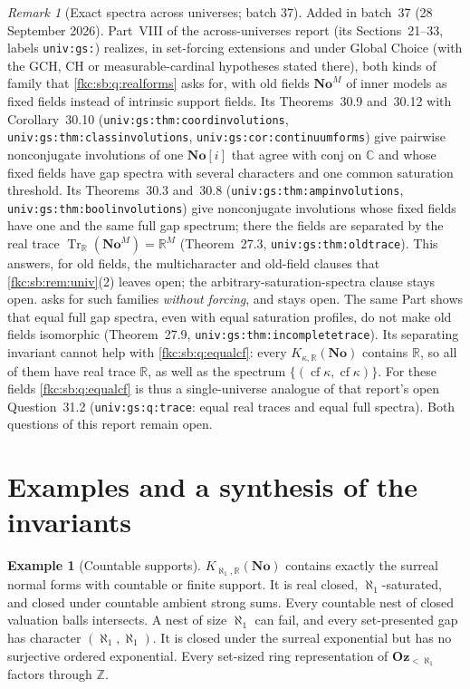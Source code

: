 \documentclass[11pt,letterpaper]{article}
\numberwithin{equation}{section}
\theoremstyle{definition}
\newtheorem{example}[theorem]{Example}
\theoremstyle{remark}
\newtheorem{remark}[theorem]{Remark}
\newcommand{\R}{\mathbb R}
\newcommand{\C}{\mathbb C}
\newcommand{\No}{\mathbf{No}}
\newcommand{\cf}{\operatorname{cf}}
\newcommand{\Z}{\mathbb Z}
\newcommand{\Oz}{\mathbf{Oz}}
\newcommand{\SC}{\mathbf{No}[i]}
\newcommand{\conj}{\mathrm{conj}}
\newcommand{\KN}[2]{K_{#1,#2}(\No)}%
\newcommand{\Okl}[1]{\Oz_{<#1}}
\newcommand{\lbl}[1]{\nolinkurl{#1}}%
\begin{document}
\begin{remark}[Exact spectra across universes; batch 37]\label{fkc:sb:rem:gapspectra}
Added in batch~37 (28 September 2026). Part~VIII of the across-universes report \cite{CollUniv} (its Sections~21--33, labels \lbl{univ:gs:}) realizes, in set-forcing extensions and under Global Choice (with the GCH, CH or measurable-cardinal hypotheses stated there), both kinds of family that \cref{fkc:sb:q:realforms} asks for, with old fields $\No^M$ of inner models as fixed fields instead of intrinsic support fields. Its Theorems~30.9 and~30.12 with Corollary~30.10 (\lbl{univ:gs:thm:coordinvolutions}, \lbl{univ:gs:thm:classinvolutions}, \lbl{univ:gs:cor:continuumforms}) give pairwise nonconjugate involutions of one $\SC$ that agree with $\conj$ on $\C$ and whose fixed fields have gap spectra with several characters and one common saturation threshold. Its Theorems~30.3 and~30.8 (\lbl{univ:gs:thm:ampinvolutions}, \lbl{univ:gs:thm:boolinvolutions}) give nonconjugate involutions whose fixed fields have one and the same full gap spectrum; there the fields are separated by the real trace $\operatorname{Tr}_{\R}(\No^M)=\R^M$ (Theorem~27.3, \lbl{univ:gs:thm:oldtrace}). This answers, for old fields, the multicharacter and old-field clauses that \cref{fkc:sb:rem:univ}(2) leaves open; the arbitrary-saturation-spectra clause stays open.  asks for such families \emph{without forcing}, and stays open. The same Part shows that equal full gap spectra, even with equal saturation profiles, do not make old fields isomorphic (Theorem~27.9, \lbl{univ:gs:thm:incompletetrace}). Its separating invariant cannot help with \cref{fkc:sb:q:equalcf}: every $\KN\kappa\R$ contains $\R$, so all of them have real trace $\R$, as well as the spectrum $\{(\cf\kappa,\cf\kappa)\}$. For these fields \cref{fkc:sb:q:equalcf} is thus a single-universe analogue of that report's open Question~31.2 (\lbl{univ:gs:q:trace}: equal real traces and equal full spectra). Both questions of this report remain open.
\end{remark}

\section{Examples and a synthesis of the invariants}\label{fkc:sb:sec:examples}

\begin{example}[Countable supports]\label{fkc:sb:ex:countable}
$\KN{\aleph_1}\R$ contains exactly the surreal normal forms with countable or finite support. It is real closed, $\aleph_1$-saturated, and closed under countable ambient strong sums. Every countable nest of closed valuation balls intersects. A nest of size $\aleph_1$ can fail, and every set-presented gap has character $(\aleph_1,\aleph_1)$. It is closed under the surreal exponential but has no surjective ordered exponential. Every set-sized ring representation of $\Okl{\aleph_1}$ factors through $\Z$.
\end{example}
\end{document}
